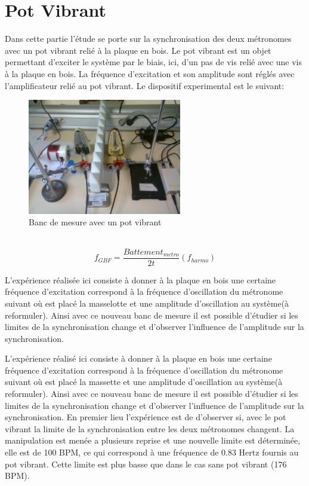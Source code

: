 \documentclass[a4paper,11pt]{report}
\begin{document}
\section{Pot Vibrant}
Dans cette partie l'étude se porte sur la synchronisation des deux métronomes avec un pot vibrant relié à la plaque en bois. Le pot vibrant est un objet permettant d'exciter le système par le biais, ici, d'un pas de vis relié avec une vis à la plaque en bois. La fréquence d'excitation et son amplitude sont réglés avec l'amplificateur relié au pot vibrant. Le dispositif experimental est le suivant:
\begin{figure}[h]
\centering
\includegraphics[width=0.6\textwidth]{Bancpotvibrant}
\caption{Banc de mesure avec un pot vibrant}\label{BancPot}
\end{figure}\\

\begin{equation}
f_{GBF}=\frac{Battement_{metro}}{2t}(f_{harmo})
\label{fgbf}
\end{equation}

L'expérience réalisée ici consiste à donner à la plaque en bois une certaine fréquence d'excitation correspond à la fréquence d'oscillation du métronome suivant où est placé la masselotte et une amplitude d'oscillation au système(à reformuler).
Ainsi avec ce nouveau banc de mesure il est possible d'étudier si les limites de la synchronisation change et d'observer l'influence de l'amplitude sur la synchronisation.

 L'expérience réalisé ici consiste à donner à la plaque en bois une certaine fréquence d'excitation correspond à la fréquence d'oscillation du métronome suivant où est placé la massette et une amplitude d'oscillation au système(à reformuler).
Ainsi avec ce nouveau banc de mesure il est possible d'étudier si les limites de la synchronisation change et d'observer l'influence de l'amplitude sur la synchronisation. En premier lieu l'expérience est de d'observer si, avec le pot vibrant la limite de la synchronisation entre les deux métronomes changent. La manipulation est menée a plusieurs reprise et une nouvelle limite est déterminée, elle est de 100 BPM, ce qui correspond à une fréquence de 0.83 Hertz fournis au pot vibrant. Cette limite est plus basse que dans le cas sans pot vibrant (176 BPM).
\end{document}
